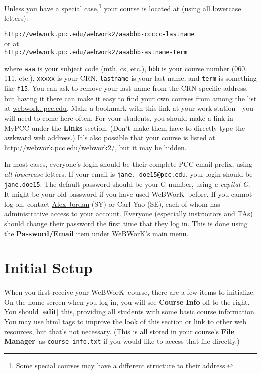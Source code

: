 \documentclass[12pt]{article}
\newcommand{\menu}[1]{\textbf{#1}}
\newcommand{\WW}{WeBWorK}
\newcommand{\FM}{\menu{File Manager}}
\begin{document}
Unless you have a special case,\footnote{Some special courses may have a different structure to their address.
} your course is located at (using all lowercase letters):
\begin{center}
	\href{http://webwork.pcc.edu/webwork2/}{\texttt{http://webwork.pcc.edu/webwork2/aaabbb-ccccc-lastname}}\\
	or at\\
	\href{http://webwork.pcc.edu/webwork2/}{\texttt{http://webwork.pcc.edu/webwork2/aaabbb-astname-term}}
\end{center} where \texttt{aaa} is your subject code (mth, cs, etc.), \texttt{bbb} is your course number (060, 111, etc.),  \texttt{xxxxx} is your CRN, \texttt{lastname} is your last name, and \texttt{term} is something like \texttt{f15}.
You can ask to remove your last name from the CRN-specific address, but having it there can make it easy to find your own courses from among the list at \url{webwork.
	pcc.edu}.
Make a bookmark with this link at your work station---you will need to come here often.
For your students, you should make a link in MyPCC under the \menu{Links} section.
(Don't make them have to directly type the awkward web address.) It's also possible that your course is listed at \href{http://webwork.pcc.edu/webwork2/}{http://webwork.pcc.edu/webwork2/}, but it may be hidden.

In most cases, everyone's login should be their complete PCC email prefix, using \emph{all lowercase} letters.
If your email is \texttt{jane.
	doe15@pcc.edu}, your login should be \texttt{jane.doe15}.
The default password should be your G-number, using \emph{a capital G}.
It might be your old password if you have used \WW\ before.
If you cannot log on, contact \href{mailto:alex.
	jordan@pcc.edu}{Alex Jordan} (SY) or Carl Yao (SE), each of whom has administrative access to your account.
Everyone (especially instructors and TAs) should change their password the first time that they log in.
This is done using the \menu{Password/Email} item under \WW's main menu.

\section{Initial Setup}
When you first receive your \WW\ course, there are a few items to initialize.
On the home screen when you log in, you will see \menu{Course Info} off to the right.
You should \menu{[edit]} this, providing all students with some basic course information.
You may use \href{http://en.
	wikipedia.org/wiki/HTML_element}{html tags} to improve the look of this section or link to other web resources, but that's not necessary.  (This is all stored in your course's \FM\  as \verb=course_info.txt= if you would like to access that file directly.)
\end{document}
